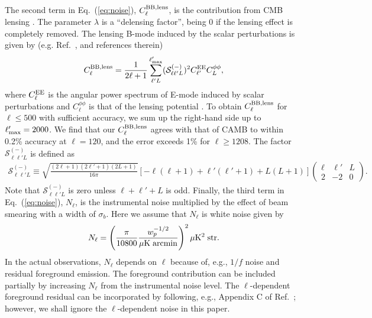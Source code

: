 \documentclass[tightenlines,floats,aps,nofootinbib,prd,onecolumn,preprintnumbers]{revtex4}
\begin{document}
The second term in Eq.~(\ref{eq:noise}), $C_\ell^{\rm BB,lens}$, is the
contribution from CMB lensing \cite{Zaldarriaga:1998ar}. The parameter
$\lambda$ is a ``delensing factor'', being $0$ if the lensing effect
is completely removed. The lensing B-mode induced by the scalar
perturbations is given by (e.g. Ref.~\cite{Namikawa:2015tba}, and references
therein) 
%
\begin{align}
 C_\ell^{\rm BB,lens} = \frac{1}{2\ell+1}
  \sum^{\ell'_{\rm max}}_{\ell'L}(\mathcal{S}^{(-)}_{\ell\ell'L})^2C_{\ell'}^{\rm EE}C_{L}^{\phi\phi},
\end{align}
%
where $C^{\rm EE}_\ell$ is the angular power spectrum of E-mode induced
by scalar perturbations and $C^{\phi\phi}_\ell$ is that of the lensing
potential \cite{Lewis:2006fu}. 
To obtain $C_\ell^{\rm BB,lens}$ for $\ell\leq 500$ with sufficient
accuracy, we sum up the right-hand side up to $\ell'_{\rm max}=2000$.
We find that our $C_\ell^{\rm BB,lens}$ agrees with that of CAMB
to within 0.2\% accuracy at $\ell=120$, and the error exceeds 1\% for
$\ell\geq 1208$. The factor $\mathcal{S}^{(-)}_{\ell\ell'L}$ is defined as
%
\begin{align}
\mathcal{S}^{(-)}_{\ell\ell'L}
\equiv \sqrt{\frac{(2\ell+1)(2\ell'+1)(2L+1)}{16\pi}}
\left[-\ell(\ell+1)+\ell'(\ell'+1)+L(L+1)\right]
\begin{pmatrix}
 \ell & \ell' & L \\
2 & -2 & 0
\end{pmatrix}.
\end{align}
%
Note that $\mathcal{S}_{\ell\ell'L}^{(-)}$ is zero unless $\ell+\ell'+L$
is odd. Finally, the third term in Eq.~(\ref{eq:noise}), $N_\ell$, is
the instrumental noise multiplied by the effect of beam smearing with a
width of $\sigma_b$.
Here we assume that $N_\ell$ is white noise
given by \cite{Katayama:2011eh}
%
\begin{equation}
 N_\ell = \left(\frac{\pi}{10800}\frac{w_p^{-1/2}}{\mu{\rm
	   K\;arcmin}}\right)^2\mu{\rm K}^2\;{\rm str}.
\end{equation}
%
In the actual observations, $N_\ell$ depends on $\ell$ because of, e.g.,
$1/f$ noise and residual foreground emission.
The foreground contribution can be included partially by increasing
$N_\ell$ from the instrumental noise level. The $\ell$-dependent
foreground residual can be incorporated by following, e.g., Appendix C
of Ref.~\cite{Thorne:2017jft}; however, we shall ignore the $\ell$-dependent noise in
this paper. 
\end{document}
